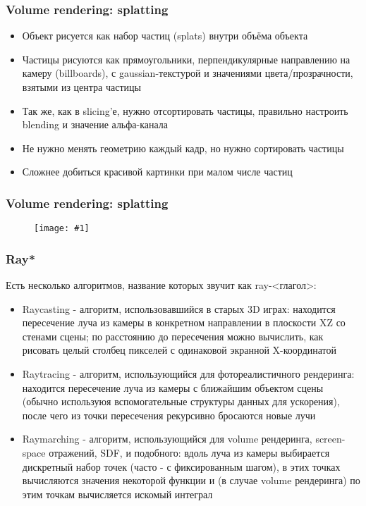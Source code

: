 \documentclass{beamer}
\newcommand{\slideimage}[1]{
  \begin{figure}
    \begin{adjustbox}{width=\textwidth, totalheight=\textheight-2\baselineskip-2\baselineskip,keepaspectratio}
      \texttt{[image: \#1]}
    \end{adjustbox}
  \end{figure}
}
\begin{document}
\begin{frame}[fragile]
\frametitle{Volume rendering: splatting}
\begin{itemize}
\item Объект рисуется как набор частиц (splats) внутри объёма объекта
\pause
\item Частицы рисуются как прямоугольники, перпендикулярные направлению на камеру (billboards), с gaussian-текстурой и значениями цвета/прозрачности, взятыми из центра частицы
\pause
\item Так же, как в slicing'е, нужно отсортировать частицы, правильно настроить blending и значение альфа-канала
\pause
\item Не нужно менять геометрию каждый кадр, но нужно сортировать частицы
\pause
\item Сложнее добиться красивой картинки при малом числе частиц
\end{itemize}
\end{frame}

\begin{frame}[fragile]
\frametitle{Volume rendering: splatting}
\slideimage{splatting-scheme.png}
\end{frame}

\begin{frame}[fragile]
\fontsize{10pt}{10pt}
\frametitle{Ray*}
Есть несколько алгоритмов, название которых звучит как ray-<глагол>:
\pause
\begin{itemize}
\item Raycasting - алгоритм, использовавшийся в старых 3D играх: находится пересечение луча из камеры в конкретном направлении в плоскости XZ со стенами сцены; по расстоянию до пересечения можно вычислить, как рисовать целый столбец пикселей с одинаковой экранной X-координатой
\pause
\item Raytracing - алгоритм, использующийся для фотореалистичного рендеринга: находится пересечение луча из камеры с ближайшим объектом сцены (обычно используюя вспомогательные структуры данных для ускорения), после чего из точки пересечения рекурсивно бросаются новые лучи
\pause
\item Raymarching - алгоритм, использующийся для volume рендеринга, screen-space отражений, SDF, и подобного: вдоль луча из камеры выбирается дискретный набор точек (часто - с фиксированным шагом), в этих точках вычисляются значения некоторой функции и (в случае volume рендеринга) по этим точкам вычисляется искомый интеграл
\end{itemize}
\end{frame}
\end{document}
